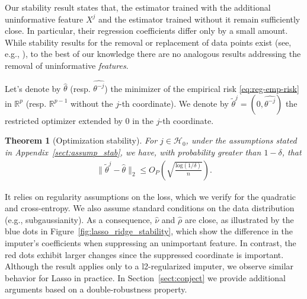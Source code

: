 \documentclass{article}
\theoremstyle{plain}
\newtheorem{theorem}{Theorem}[section]
\theoremstyle{definition}
\theoremstyle{remark}
\begin{document}
Our stability result states that, the estimator trained with the additional uninformative feature $X^{j}$ and the estimator trained without it remain sufficiently close. 
%
In particular, their regression coefficients differ only by a small amount. 
%
While stability results for the removal or replacement of data points exist (see, e.g., \citet{bousquet2002stability}), to the best of our knowledge there are no analogous results addressing the removal of uninformative \emph{features}.
 
 Let's denote by $\widehat{\theta}$ (resp. $\widehat{\theta^{-j}}$) the minimizer of the empirical risk \eqref{eq:reg-emp-risk} in $\mathbb{R}^p$  (resp. $\mathbb{R}^{p-1}$ without the $j$-th coordinate). We denote by $\widetilde{\theta}^{j}=(0, \widehat{\theta^{-j}})$ the restricted optimizer extended by 0 in the $j$-th coordinate.
 
 
 \begin{theorem}[Optimization stability]\label{thm:opt_stab}
For $j \in \mathcal{H}_0$, under the assumptions stated in Appendix~\ref{sect:assump_stab}, we have, with probability greater than $1-\delta$, that
 \begin{align}
     \|\widetilde{\theta}^{j}-\widehat{\theta}\|_2\leq O_P\left(\sqrt{\frac{\mathrm{log}(1/\delta)}{n}}\right).
 \end{align}
 \end{theorem}
 
It relies on regularity assumptions on the loss, which we verify for the quadratic and cross-entropy. We also assume standard conditions on the data distribution (e.g., subgaussianity). As a consequence, $\widehat{\nu}$ and $\widehat{\rho}$ are close, as illustrated by the blue dots in Figure~\ref{fig:lasso_ridge_stability}, which show the difference in the imputer’s coefficients when suppressing an unimportant feature. In contrast, the red dots exhibit larger changes since the suppressed coordinate is important. Although the result applies only to a l2-regularized imputer, we observe similar behavior for Lasso in practice. In Section~\ref{sect:conject} we provide additional arguments based on a double-robustness property.

\end{document}
